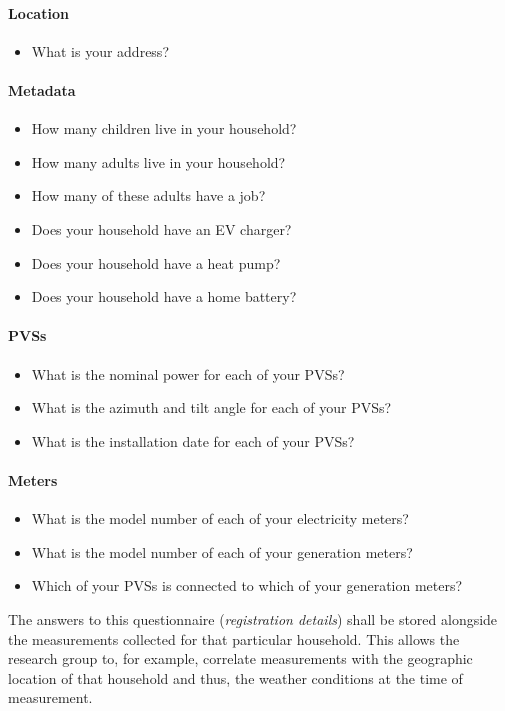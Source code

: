 \paragraph{Location}
\begin{itemize}
  \item What is your address?
\end{itemize}

\paragraph{Metadata}
\begin{itemize}
  \item How many children live in your household?
  \item How many adults live in your household?
  \item How many of these adults have a job?
  \item Does your household have an \acs{EV} charger?
  \item Does your household have a heat pump?
  \item Does your household have a home battery?
\end{itemize}

\paragraph{\aclp{PVS}}
\begin{itemize}
  \item What is the nominal power for each of your \acp{PVS}?
  \item What is the azimuth and tilt angle for each of your \acp{PVS}?
  \item What is the installation date for each of your \acp{PVS}?
\end{itemize}

\paragraph{Meters}
\begin{itemize}
  \item What is the model number of each of your electricity meters?
  \item What is the model number of each of your generation meters?
  \item Which of your \acsp{PVS} is connected to which of your generation meters?
\end{itemize}

The answers to this questionnaire (\textit{registration details}) shall be stored alongside the measurements  collected for that particular household. This allows the research group to, for example, correlate measurements with the geographic location of that household and thus, the weather conditions at the time of measurement.


